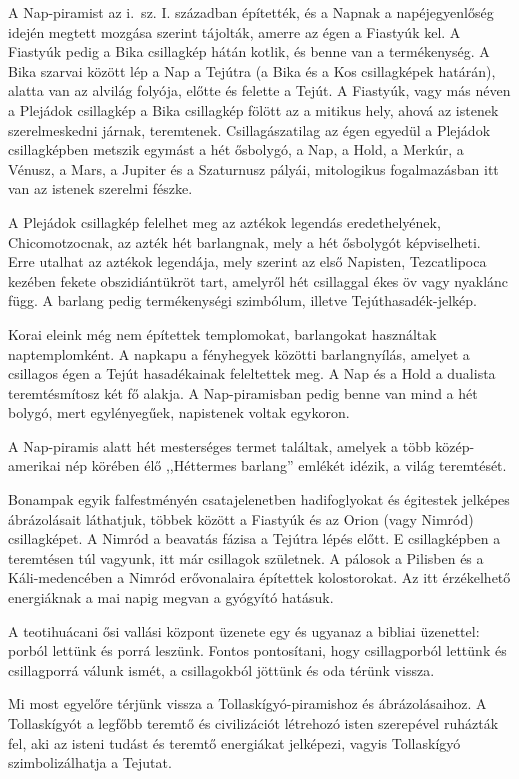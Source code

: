 A Nap-piramist az i.~sz. I. században építették, és a Napnak a
napéjegyenlőség idején megtett mozgása szerint tájolták, amerre az égen a
Fiastyúk kel. A Fiastyúk pedig a Bika csillagkép hátán kotlik, és benne
van a termékenység. A Bika szarvai között lép a Nap a Tejútra (a Bika
és a Kos csillagképek határán), alatta van az alvilág folyója, előtte és
felette a Tejút. A Fiastyúk, vagy más néven a Plejádok csillagkép a Bika
csillagkép fölött az a mitikus hely, ahová az istenek szerelmeskedni
járnak, teremtenek. Csillagászatilag az égen egyedül a Plejádok
csillagképben metszik egymást a hét ősbolygó, a Nap, a Hold, a Merkúr,
a Vénusz, a Mars, a Jupiter és a Szaturnusz pályái, mitologikus
fogalmazásban itt van az istenek szerelmi fészke.

A Plejádok csillagkép felelhet meg az aztékok legendás eredethelyének,
Chicomotzocnak, az azték hét barlangnak, mely a hét ősbolygót
képviselheti. Erre utalhat az aztékok legendája, mely szerint az első
Napisten, Tezcatlipoca kezében fekete obszidiántükröt tart, amelyről
hét csillaggal ékes öv vagy nyaklánc függ. A barlang pedig termékenységi
szimbólum, illetve Tejúthasadék-jelkép.

Korai eleink még nem építettek templomokat, barlangokat használtak
naptemplomként. A napkapu a fényhegyek közötti barlangnyílás,
amelyet a csillagos égen a Tejút hasadékainak feleltettek meg. A Nap
és a Hold a dualista teremtésmítosz két fő alakja. A Nap-piramisban
pedig benne van mind a hét bolygó, mert egylényegűek, napistenek
voltak egykoron.

A Nap-piramis alatt hét mesterséges termet találtak, amelyek a
több közép-amerikai nép körében élő ,,Héttermes barlang'' emlékét
idézik, a világ teremtését.

Bonampak egyik falfestményén csatajelenetben hadifoglyokat és
égitestek jelképes ábrázolásait láthatjuk, többek között a Fiastyúk
és az Orion (vagy Nimród) csillagképet. A Nimród a beavatás fázisa
a Tejútra lépés előtt. E csillagképben a teremtésen túl vagyunk, itt
már csillagok születnek. A pálosok a Pilisben és a Káli-medencében a
Nimród erővonalaira építettek kolostorokat. Az itt érzékelhető energiáknak
a mai napig megvan a gyógyító hatásuk.

A teotihuácani ősi vallási központ üzenete egy és ugyanaz a bibliai
üzenettel: porból lettünk és porrá leszünk. Fontos pontosítani, hogy
csillagporból lettünk és csillagporrá válunk ismét, a csillagokból
jöttünk és oda térünk vissza.

Mi most egyelőre térjünk vissza a Tollaskígyó-piramishoz és ábrázolásaihoz.
A Tollaskígyót a legfőbb teremtő és civilizációt létrehozó
isten szerepével ruházták fel, aki az isteni tudást és teremtő energiákat
jelképezi, vagyis Tollaskígyó szimbolizálhatja a Tejutat.

